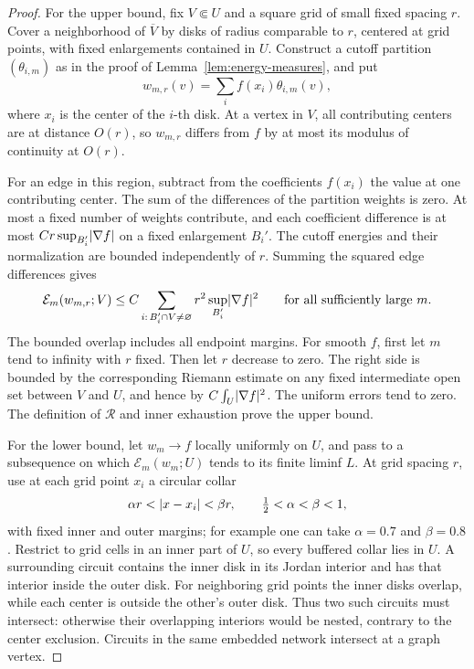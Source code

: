\begin{proof}
For the upper bound, fix \(V\Subset U\) and a square grid of small fixed
spacing \(r\).  Cover a neighborhood of \(\overline V\) by disks of radius
comparable to \(r\), centered at grid points, with fixed enlargements
contained in \(U\).  Construct a cutoff partition
\((\theta_{i,m})\) as in the proof of Lemma~\ref{lem:energy-measures},
and put
\[
 w_{m,r}(v)=\sum_i f(x_i)\theta_{i,m}(v),
\]
where \(x_i\) is the center of the \(i\)-th disk.  At a vertex in \(V\),
all contributing centers are at distance \(O(r)\), so \(w_{m,r}\)
differs from \(f\) by at most its modulus of continuity at \(O(r)\).

For an edge in this region, subtract from the coefficients \(f(x_i)\)
the value at one contributing center.  The sum of the differences of
the partition weights is zero.  At most a fixed number of weights
contribute, and each coefficient difference is at most
\(Cr\sup_{B_i'}\lvert \nabla f\rvert\) on a fixed enlargement \(B_i'\).
The cutoff energies and their normalization are bounded independently
of \(r\).  Summing the squared edge differences gives
\begin{equation}\label{eq:partition-energy}
 \mathcal E_m(w_{m,r};V)
 \le C\sum_{i:\,B_i'\cap V\ne\varnothing}
             r^2\sup_{B_i'}\lvert \nabla f\rvert^2
 \qquad\text{for all sufficiently large }m.
\end{equation}
The bounded overlap includes all endpoint margins.  For smooth \(f\),
first let \(m\) tend to infinity with \(r\) fixed.  Then let \(r\)
decrease to zero.  The right side is bounded by the corresponding
Riemann estimate on any fixed intermediate open set between \(V\) and
\(U\), and hence by \(C\int_U\lvert \nabla f\rvert^2\).
The uniform errors tend to zero.  The definition of \(\mathcal R\)
and inner exhaustion prove the upper bound.

For the lower bound, let \(w_m\to f\) locally uniformly on \(U\), and
pass to a subsequence on which
\(\mathcal E_m(w_m;U)\) tends to its finite liminf \(L\).  At grid
spacing \(r\), use at each grid point \(x_i\) a circular collar
\[
       \alpha r<\lvert x-x_i\rvert<\beta r,
       \qquad \tfrac12<\alpha<\beta<1,
\]
with fixed inner and outer margins; for example one can take
\(\alpha=0.7\) and \(\beta=0.8\).
Restrict to grid cells in an inner part of \(U\), so every buffered
collar lies in \(U\).  A surrounding circuit contains the inner disk
in its Jordan interior and has that interior inside the outer disk.
For neighboring grid points the inner disks overlap, while each center
is outside the other's outer disk.  Thus two such circuits must
intersect: otherwise their overlapping interiors would be nested,
contrary to the center exclusion.  Circuits in the same embedded
network intersect at a graph vertex.


\end{proof}
